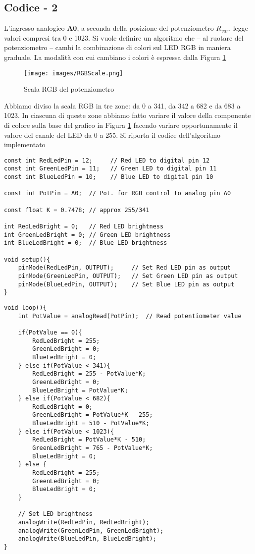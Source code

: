 \subsection{Codice - 2}
L’ingresso analogico \textbf{A0}, a seconda della posizione del potenziometro $R_{var}$, legge valori compresi tra 0 e 1023. Si vuole  definire un algoritmo che – al ruotare del potenziometro – cambi la combinazione di colori sul LED RGB in maniera graduale. La modalità con cui cambiano i colori è espressa dalla Figura \ref{fig:RGBScale}
\begin{figure}[H]
    \centering
    \texttt{[image: images/RGBScale.png]}
    \caption{Scala RGB del potenziometro}
    \label{fig:RGBScale}
\end{figure}
Abbiamo diviso la scala RGB in tre zone: da 0 a 341, da 342 a 682 e da 683 a 1023. In ciascuna di queste zone abbiamo fatto variare il valore della componente di colore sulla base del grafico in Figura \ref{fig:RGBScale} facendo variare opportunamente il valore del canale del LED da 0 a 255. Si riporta il codice dell'algoritmo implementato
\begin{lstlisting}[frame=single, language=Arduino]
const int RedLedPin = 12;     // Red LED to digital pin 12
const int GreenLedPin = 11;   // Green LED to digital pin 11
const int BlueLedPin = 10;    // Blue LED to digital pin 10

const int PotPin = A0;  // Pot. for RGB control to analog pin A0

const float K = 0.7478; // approx 255/341

int RedLedBright = 0;   // Red LED brightness
int GreenLedBright = 0; // Green LED brightness
int BlueLedBright = 0;  // Blue LED brightness

void setup(){
    pinMode(RedLedPin, OUTPUT);     // Set Red LED pin as output
    pinMode(GreenLedPin, OUTPUT);   // Set Green LED pin as output
    pinMode(BlueLedPin, OUTPUT);    // Set Blue LED pin as output
}
\end{lstlisting}
\clearpage
\begin{lstlisting}[frame=single, language=Arduino]
void loop(){
    int PotValue = analogRead(PotPin);  // Read potentiometer value

    if(PotValue == 0){
        RedLedBright = 255;
        GreenLedBright = 0;
        BlueLedBright = 0;
    } else if(PotValue < 341){
        RedLedBright = 255 - PotValue*K;
        GreenLedBright = 0;
        BlueLedBright = PotValue*K;
    } else if(PotValue < 682){
        RedLedBright = 0;
        GreenLedBright = PotValue*K - 255;
        BlueLedBright = 510 - PotValue*K;
    } else if(PotValue < 1023){
        RedLedBright = PotValue*K - 510;
        GreenLedBright = 765 - PotValue*K;
        BlueLedBright = 0;
    } else {
        RedLedBright = 255;
        GreenLedBright = 0;
        BlueLedBright = 0;
    }

    // Set LED brightness
    analogWrite(RedLedPin, RedLedBright); 
    analogWrite(GreenLedPin, GreenLedBright);
    analogWrite(BlueLedPin, BlueLedBright);   
}
\end{lstlisting}
